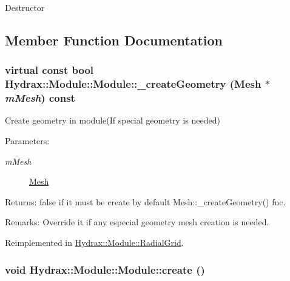 Destructor 

\subsection{Member Function Documentation}
\hypertarget{class_hydrax_1_1_module_1_1_module_e58d6103f780287cb00a8c4647db667e}{
\subsubsection[{\_\-createGeometry}]{\setlength{\rightskip}{0pt plus 5cm}virtual const bool Hydrax::Module::Module::\_\-createGeometry ({\bf Mesh} $\ast$ {\em mMesh}) const}}
\label{class_hydrax_1_1_module_1_1_module_e58d6103f780287cb00a8c4647db667e}


Create geometry in module(If special geometry is needed) \begin{Desc}
\item[Parameters:]
\begin{description}
\item[{\em mMesh}]\hyperlink{class_hydrax_1_1_mesh}{Mesh} \end{description}
\end{Desc}
\begin{Desc}
\item[Returns:]false if it must be create by default Mesh::\_\-createGeometry() fnc. \end{Desc}
\begin{Desc}
\item[Remarks:]Override it if any especial geometry mesh creation is needed. \end{Desc}


Reimplemented in \hyperlink{class_hydrax_1_1_module_1_1_radial_grid_8fde866e72e871e7aaf76957236b7b15}{Hydrax::Module::RadialGrid}.\hypertarget{class_hydrax_1_1_module_1_1_module_4b696328c3fc1496f757e929f44f3258}{
\subsubsection[{create}]{\setlength{\rightskip}{0pt plus 5cm}void Hydrax::Module::Module::create ()}}
\label{class_hydrax_1_1_module_1_1_module_4b696328c3fc1496f757e929f44f3258}


